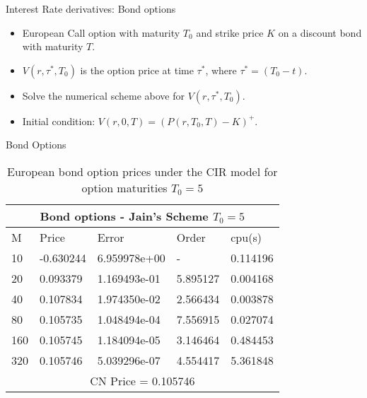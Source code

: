 \documentclass{beamer}
\begin{document}
\begin{frame}{Interest Rate derivatives: Bond options}
\begin{itemize}
    \item  European Call option with maturity $T_{0}$ and strike price $K$ on a discount bond  with maturity $T$.
    \item $V(r,\tau^{*}, T_{0})$ is the option price at time $\tau^{*}$, where $\tau^{*} = (T_{0}-t)$.
    \item Solve the numerical scheme above for $V(r,\tau^{*}, T_{0})$.
    \item Initial condition: $V(r,0,T) = (P(r,T_{0},T) - K)^{+}$. 
\end{itemize}
 
\end{frame}


\begin{frame}{Bond Options}
    \begin{table}[htp]
    \begin{tabular}{ |p{1cm}|p{1.7cm}|p{2.5cm}|p{2cm}|p{1.5cm}|  }
    
     \hline
    \multicolumn{5}{|c|}{Bond options - Jain’s Scheme   $T_0 = 5$   } \\
     \hline
     M & Price & Error & Order & cpu(s)\\
     \hline
    10 & -0.630244 & 6.959978e+00 &  - & 0.114196\\
    20 & 0.093379 & 1.169493e-01 & 5.895127 & 0.004168\\
    40 & 0.107834 & 1.974350e-02 & 2.566434 & 0.003878\\
    80 & 0.105735 & 1.048494e-04 & 7.556915 & 0.027074\\
    160 & 0.105745 & 1.184094e-05 & 3.146464 & 0.484453\\
    320 & 0.105746 & 5.039296e-07 & 4.554417 & 5.361848\\
     \hline
     \multicolumn{5}{|c|}{CN Price = 0.105746} \\
     \hline
     
    \end{tabular}
    \caption{ European bond option prices under the CIR model for option maturities $T_0 = 5$}
        
    \end{table}
\end{frame}
\end{document}
